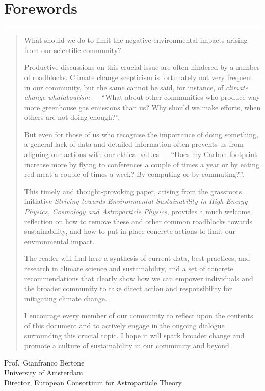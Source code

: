 \documentclass[../SustainableHEP.tex]{subfiles}
\begin{document}
\RaggedRight
\sloppy
\newpage


\section*{Forewords}
\label{sec:Forewords}

\textcolor{Pythongreen}{\rule{2cm}{3pt}}

\begin{quotation}
What should we do to limit the negative environmental impacts arising from our scientific community?
 
Productive discussions on this crucial issue are often hindered by a number of roadblocks. Climate change scepticism is fortunately not very frequent in our community, but the same cannot be said, for instance, of \textit{climate change whataboutism}  ---  ``What about other communities who produce way more greenhouse gas emissions than us? Why should we make efforts, when others are not doing enough?''. 

But even for those of us who recognise the importance of doing something, a general lack of data and detailed information often prevents us from aligning our actions with our ethical values --- ``Does my Carbon footprint increase more by flying to conferences a couple of times a year or by eating red meat a couple of times a week? By computing or by commuting?''.
 
This timely and thought-provoking paper, arising from the grassroots initiative \textit{Striving
towards Environmental Sustainability in High Energy Physics, Cosmology and
Astroparticle Physics}, provides a much welcome reflection on how to remove these and other common roadblocks towards sustainability, and how to put in place concrete actions to limit our environmental impact.
 
The reader will find here a synthesis of current data, best practices, and research in climate science and sustainability, and a set of concrete recommendations that clearly show how we can empower individuals and the broader community to take direct action and responsibility for mitigating climate change.
 
I encourage every member of our community to reflect upon the contents of this document and to actively engage in the ongoing dialogue surrounding this crucial topic. I hope it will spark broader change and promote a culture of sustainability in our community and beyond.
\end{quotation}
\begin{flushleft}
Prof.\ Gianfranco Bertone\\
University of Amsterdam\\
Director, European Consortium for Astroparticle Theory
\end{flushleft}
\end{document}
